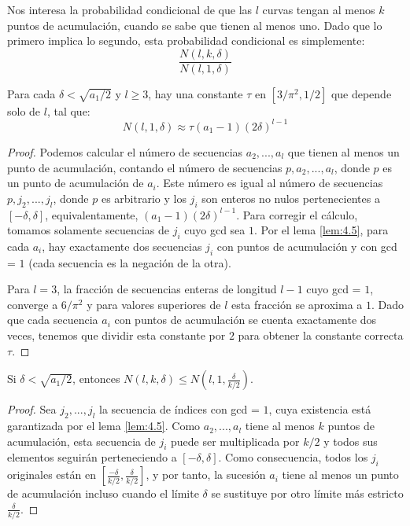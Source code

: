     Nos interesa la probabilidad condicional de que las $l$ curvas tengan al menos $k$ puntos de acumulación, cuando se sabe que tienen al menos uno. Dado que lo primero implica lo segundo, esta probabilidad condicional es simplemente:
    \begin{equation}
        \frac{N(l, k, \delta)}{N(l, 1, \delta)} 
    \end{equation}

    \begin{lema} \cite{artSha}
        Para cada $\delta < \sqrt{a_{1}/2}$ y $l \geq 3$, hay una constante $\tau$ en $[3/\pi^{2}, 1/2]$ que depende solo de $l$, tal que:
        \begin{equation}
            N(l, 1, \delta) \approx \tau(a_{1} - 1)(2\delta)^{l - 1}
        \end{equation}
    \end{lema}
    
    \begin{proof}
        Podemos calcular el número de secuencias $a_{2}, ... , a_{l}$ que tienen al menos un punto de acumulación, contando el número de secuencias $p, a_{2}, ... , a_{l}$, donde $p$ es un punto de acumulación de $a_{i}$. Este número es igual al número de secuencias $p, j_{2}, ... , j_{l}$, donde $p$ es arbitrario y los $j_{i}$ son enteros no nulos pertenecientes a $[-\delta, \delta]$, equivalentamente, $(a_{1} - 1)(2\delta)^{l - 1}$. Para corregir el cálculo, tomamos solamente secuencias de $j_{i}$ cuyo gcd sea $1$. Por el lema \ref{lem:4.5}, para cada $a_{i}$, hay exactamente dos secuencias $j_{i}$ con puntos de acumulación y con gcd = $1$ (cada secuencia es la negación de la otra). 
        
        Para $l = 3$, la fracción de secuencias enteras de longitud $l - 1$ cuyo gcd = $1$, converge a $6/\pi^{2}$ y para valores superiores de $l$ esta fracción se aproxima a $1$. Dado que cada secuencia $a_{i}$ con puntos de acumulación se cuenta exactamente dos veces, tenemos que dividir esta constante por $2$ para obtener la constante correcta $\tau$.
    \end{proof}

    \begin{lema} \cite{artSha}
        Si $\delta < \sqrt{a_{1}/2}$, entonces $N(l, k, \delta) \leq N(l, 1, \frac{\delta}{k/2})$.
    \end{lema}
    
    \begin{proof}
        Sea $j_{2}, ... , j_{l}$ la secuencia de índices con gcd = $1$, cuya existencia está garantizada por el lema \ref{lem:4.5}. Como $a_{2}, ... , a_{l}$ tiene al menos $k$ puntos de acumulación, esta secuencia de $j_{i}$ puede ser multiplicada por $k/2$ y todos sus elementos seguirán perteneciendo a $[-\delta, \delta]$. Como consecuencia, todos los $j_{i}$ originales están en $[\frac{-\delta}{k/2}, \frac{\delta}{k/2}]$, y por tanto, la sucesión $a_{i}$ tiene al menos un punto de acumulación incluso cuando el límite $\delta$ se sustituye por otro límite más estricto $\frac{\delta}{k/2}$.
    \end{proof}

